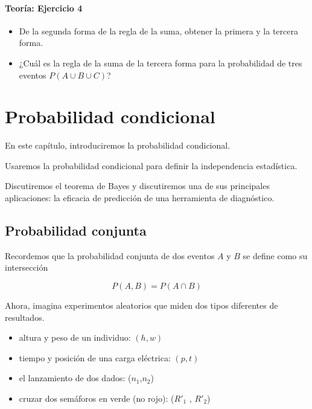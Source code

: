 \documentclass[
]{book}
\begin{document}
\hypertarget{teoruxeda-ejercicio-4}{%
\subsubsection{Teoría: Ejercicio 4}\label{teoruxeda-ejercicio-4}}

\begin{itemize}
\item
  De la segunda forma de la regla de la suma, obtener la primera y la tercera forma.
\item
  ¿Cuál es la regla de la suma de la tercera forma para la probabilidad de tres eventos \(P(A \cup B \cup C)\)?
\end{itemize}

\hypertarget{probabilidad-condicional}{%
\chapter{Probabilidad condicional}\label{probabilidad-condicional}}

En este capítulo, introduciremos la probabilidad condicional.

Usaremos la probabilidad condicional para definir la independencia estadística.

Discutiremos el teorema de Bayes y discutiremos una de sus principales aplicaciones: la eficacia de predicción de una herramienta de diagnóstico.

\hypertarget{probabilidad-conjunta}{%
\section{Probabilidad conjunta}\label{probabilidad-conjunta}}

Recordemos que la probabilidad conjunta de dos eventos \(A\) y \(B\) se define como su intersección

\[P( A,B )=P(A \cap B)\]

Ahora, imagina experimentos aleatorios que miden dos tipos diferentes de resultados.

\begin{itemize}
\item
  altura y peso de un individuo: \((h, w)\)
\item
  tiempo y posición de una carga eléctrica: \((p, t)\)
\item
  el lanzamiento de dos dados: (\(n_1\),\(n_2\))
\item
  cruzar dos semáforos en verde (no rojo): (\(R'_1\) , \(R'_2\))
\end{itemize}
\end{document}
